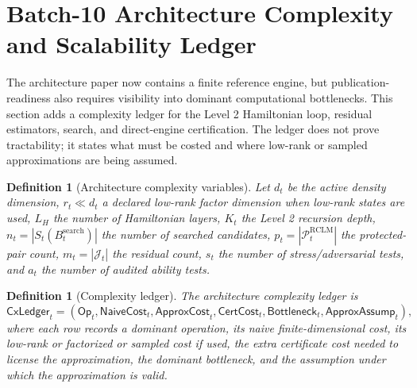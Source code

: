 \documentclass[11pt,a4paper]{article}
\newtheorem{definition}[theorem]{Definition}
\newcommand{\Pcal}{\mathcal P}
\newcommand{\RCLM}{\mathrm{RCLM}}
\newcommand{\search}{\mathrm{search}}
\begin{document}
\section{Batch-10 Architecture Complexity and Scalability Ledger}
\label{sec:batch10-complexity-ledger}

The architecture paper now contains a finite reference engine, but publication-readiness also requires visibility into dominant computational bottlenecks.  This section adds a complexity ledger for the Level 2 Hamiltonian loop, residual estimators, search, and direct-engine certification.  The ledger does not prove tractability; it states what must be costed and where low-rank or sampled approximations are being assumed.

\begin{definition}[Architecture complexity variables]
\label{def:architecture-complexity-variables}
Let \(d_t\) be the active density dimension, \(r_t\ll d_t\) a declared low-rank factor dimension when low-rank states are used, \(L_H\) the number of Hamiltonian layers, \(K_t\) the Level 2 recursion depth, \(n_t=|S_t(B_t^{\search})|\) the number of searched candidates, \(p_t=|\Pcal_t^{\RCLM}|\) the protected-pair count, \(m_t=|\mathcal J_t|\) the residual count, \(s_t\) the number of stress/adversarial tests, and \(a_t\) the number of audited ability tests.
\end{definition}

\begin{definition}[Complexity ledger]
\label{def:complexity-ledger}
The architecture complexity ledger is
\[
\mathsf{CxLedger}_t=
(\mathsf{Op}_t,\mathsf{NaiveCost}_t,\mathsf{ApproxCost}_t,\mathsf{CertCost}_t,\mathsf{Bottleneck}_t,\mathsf{ApproxAssump}_t),
\]
where each row records a dominant operation, its naive finite-dimensional cost, its low-rank or factorized or sampled cost if used, the extra certificate cost needed to license the approximation, the dominant bottleneck, and the assumption under which the approximation is valid.
\end{definition}
\end{document}
